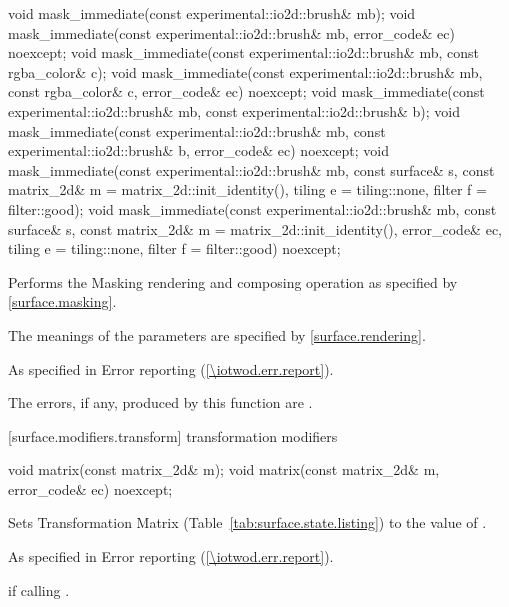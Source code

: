 \begin{itemdecl}
void mask_immediate(const experimental::io2d::brush& mb);
void mask_immediate(const experimental::io2d::brush& mb, 
  error_code& ec) noexcept;
void mask_immediate(const experimental::io2d::brush& mb,
  const rgba_color& c);
void mask_immediate(const experimental::io2d::brush& mb,
  const rgba_color& c, error_code& ec) noexcept;
void mask_immediate(const experimental::io2d::brush& mb,
  const experimental::io2d::brush& b);
void mask_immediate(const experimental::io2d::brush& mb,
  const experimental::io2d::brush& b, error_code& ec) noexcept;
void mask_immediate(const experimental::io2d::brush& mb, const surface& s, 
  const matrix_2d& m = matrix_2d::init_identity(), tiling e = tiling::none, 
  filter f = filter::good);
void mask_immediate(const experimental::io2d::brush& mb, const surface& s,
  const matrix_2d& m = matrix_2d::init_identity(), error_code& ec,
  tiling e = tiling::none, filter f = filter::good) noexcept;
\end{itemdecl}
\begin{itemdescr}
\pnum
\effects
Performs the Masking rendering and composing operation as specified by \ref{surface.masking}.

\pnum
The meanings of the parameters are specified by \ref{surface.rendering}.

\pnum
\throws
As specified in Error reporting (\ref{\iotwod.err.report}).

\pnum
\errors
The errors, if any, produced by this function are .
\end{itemdescr}

 [surface.modifiers.transform] { transformation modifiers}

\begin{itemdecl}
void matrix(const matrix_2d& m);
void matrix(const matrix_2d& m, error_code& ec) noexcept;
\end{itemdecl}
\begin{itemdescr}
\pnum
\effects
Sets Transformation Matrix (Table~\ref{tab:surface.state.listing}) to the value of .

\pnum
\throws
As specified in Error reporting (\ref{\iotwod.err.report}).

\pnum
\errors
{} if calling .
\end{itemdescr}

